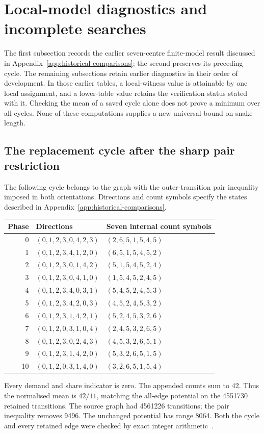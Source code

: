\documentclass[11pt,a4paper]{article}
\theoremstyle{definition}
\theoremstyle{remark}
\begin{document}
\section{Local-model diagnostics and incomplete searches}\label{app:diagnostics}
The first subsection records the earlier seven-centre finite-model result discussed in Appendix~\ref{app:historical-comparisons}; the second preserves its preceding cycle. The remaining subsections retain earlier diagnostics in their order of development. In those earlier tables, a local-witness value is attainable by one local assignment, and a lower-table value retains the verification status stated with it. Checking the mean of a saved cycle alone does not prove a minimum over all cycles. None of these computations supplies a new universal bound on snake length.

\subsection{The replacement cycle after the sharp pair restriction}\label{app:replacement-cycle}
The following cycle belongs to the graph with the outer-transition pair inequality imposed in both orientations. Directions and count symbols specify the states described in Appendix~\ref{app:historical-comparisons}.
\begin{center}
\begin{tabular}{rll}
\toprule
Phase & Directions & Seven internal count symbols\\\midrule
0 & $(0,1,2,3,0,4,2,3)$ & $(2,6,5,1,5,4,5)$\\
1 & $(0,1,2,3,4,1,2,0)$ & $(6,5,1,5,4,5,2)$\\
2 & $(0,1,2,3,0,1,4,2)$ & $(5,1,5,4,5,2,4)$\\
3 & $(0,1,2,3,0,4,1,0)$ & $(1,5,4,5,2,4,5)$\\
4 & $(0,1,2,3,4,0,3,1)$ & $(5,4,5,2,4,5,3)$\\
5 & $(0,1,2,3,4,2,0,3)$ & $(4,5,2,4,5,3,2)$\\
6 & $(0,1,2,3,1,4,2,1)$ & $(5,2,4,5,3,2,6)$\\
7 & $(0,1,2,0,3,1,0,4)$ & $(2,4,5,3,2,6,5)$\\
8 & $(0,1,2,3,0,2,4,3)$ & $(4,5,3,2,6,5,1)$\\
9 & $(0,1,2,3,1,4,2,0)$ & $(5,3,2,6,5,1,5)$\\
10 & $(0,1,2,0,3,1,4,0)$ & $(3,2,6,5,1,5,4)$\\
\bottomrule
\end{tabular}
\end{center}
Every demand and share indicator is zero. The appended counts sum to 42. Thus the normalised mean is $42/11$, matching the all-edge potential on the 4551730 retained transitions. The source graph had 4561226 transitions; the pair inequality removes 9496. The unchanged potential has range 8064. Both the cycle and every retained edge were checked by exact integer arithmetic~\cite{outerpairarchive}.
\end{document}
